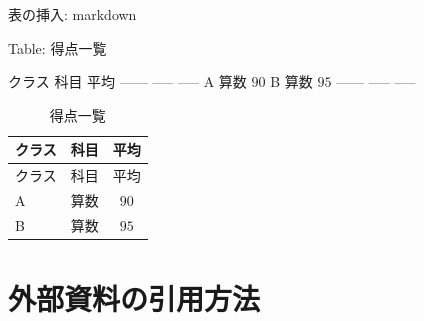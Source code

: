 \documentclass[14pt,ignorenonframetext,]{beamer}
\newenvironment{Shaded}{\begin{snugshade}}{\end{snugshade}}
\newcommand{\NormalTok}[1]{#1}
\begin{document}
\begin{frame}[fragile]{表の挿入: markdown}
\protect\hypertarget{ux8868ux306eux633fux5165-markdown}{}

\small

\begin{Shaded}
\begin{Highlighting}[]
\NormalTok{Table: 得点一覧}

\NormalTok{  クラス 科目   平均}
\NormalTok{  ------ ----- -----}
\NormalTok{  A      算数   $90$}
\NormalTok{  B      算数   $95$}
\NormalTok{  ------ ----- -----}
\end{Highlighting}
\end{Shaded}

\normalsize

\begin{longtable}[]{@{}llc@{}}
\caption{得点一覧}\tabularnewline
\toprule
クラス & 科目 & 平均\tabularnewline
\midrule
\endfirsthead
\toprule
クラス & 科目 & 平均\tabularnewline
\midrule
\endhead
A & 算数 & \(90\)\tabularnewline
B & 算数 & \(95\)\tabularnewline
\bottomrule
\end{longtable}

\end{frame}

\hypertarget{ux5916ux90e8ux8cc7ux6599ux306eux5f15ux7528ux65b9ux6cd5}{%
\section{外部資料の引用方法}\label{ux5916ux90e8ux8cc7ux6599ux306eux5f15ux7528ux65b9ux6cd5}}
\end{document}
